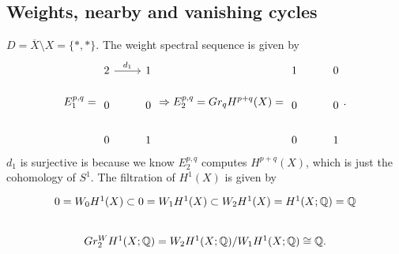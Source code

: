 \documentclass[../main.tex]{subfiles}
\begin{document}
\subsection{Weights, nearby and vanishing cycles}
\begin{example}[$X=\mathbb{C}^{\times}\hookrightarrow\mathbb{P}_{\mathbb{C}}^{1}=\overline{X}$, weight filtration]
$D=\overline{X}\setminus X=\{*, *\}$. The weight spectral sequence is given by 
$$
E_{1}^{p,q}=\begin{tikzcd}2 \arrow{r}{d_{1}}& 1\\
0 & 0\\
0 & 1\end{tikzcd}\Rightarrow E_{2}^{p,q}=Gr_{q}H^{p+q}(X)=\begin{tikzcd}1 & 0\\
0 & 0\\
0 & 1\end{tikzcd}.$$
$d_{1}$ is surjective is because we know $E_{2}^{p,q}$ computes $H^{p+q}(X)$, which is just the cohomology of $S^{1}$. The filtration of $H^{1}(X)$ is given by 
$$
\begin{tikzcd}
0=W_{0}H^{1}(X)\subset 0=W_{1}H^{1}(X) \subset W_{2}H^{1}(X)=H^{1}(X; \mathbb{Q})=\mathbb{Q}\\
Gr_{2}^{W}H^{1}(X; \mathbb{Q})=W_{2}H^{1}(X;\mathbb{Q})/W_{1}H^{1}(X; \mathbb{Q})\cong \mathbb{Q}.
\end{tikzcd}
$$
\end{example}
\end{document}
